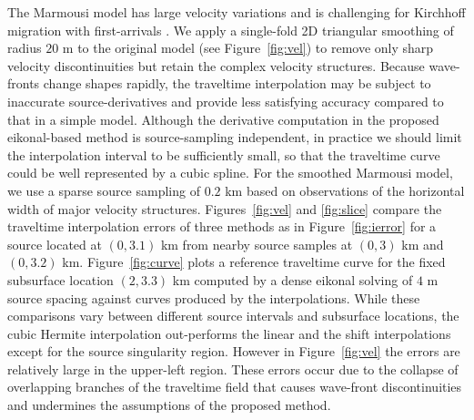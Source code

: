 The Marmousi model \cite[]{versteeg} has large velocity variations and is challenging for Kirchhoff 
migration with first-arrivals \cite[]{geoltrain}. We apply a single-fold 2D triangular smoothing of 
radius $20$ m to the original model (see Figure~\ref{fig:vel}) to remove only sharp velocity discontinuities 
but retain the complex velocity structures. Because wave-fronts change shapes rapidly, the traveltime 
interpolation may be subject to inaccurate source-derivatives and provide less satisfying accuracy 
compared to that in a simple model. Although the derivative computation in the proposed eikonal-based 
method is source-sampling independent, in practice we should limit the interpolation interval to be 
sufficiently small, so that the traveltime curve could be well represented by a cubic spline. For the 
smoothed Marmousi model, we use a sparse source sampling of $0.2$ km based on observations of the 
horizontal width of major velocity structures. Figures~\ref{fig:vel} and \ref{fig:slice} compare the 
traveltime interpolation errors of three methods as in Figure~\ref{fig:ierror} for a source located 
at $(0,3.1)$ km from nearby source samples at $(0,3)$ km and $(0,3.2)$ km. Figure~\ref{fig:curve} plots 
a reference traveltime curve for the fixed subsurface location $(2,3.3)$ km computed by a dense eikonal 
solving of $4$ m source spacing against curves produced by the interpolations. While these comparisons 
vary between different source intervals and subsurface locations, the cubic Hermite interpolation 
out-performs the linear and the shift interpolations except for the source singularity region. However 
in Figure~\ref{fig:vel} the errors are relatively large in the upper-left region. These errors occur 
due to the collapse of overlapping branches of the traveltime field \cite[]{xu} that causes wave-front 
discontinuities and undermines the assumptions of the proposed method.



